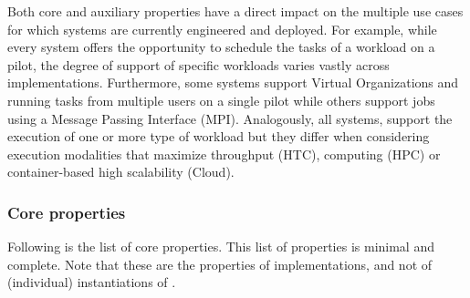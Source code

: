 \documentclass{sig-alternate}
\begin{document}
Both core and auxiliary properties have a direct impact on the multiple use
cases for which \pilot systems are currently engineered and deployed. For
example, while every \pilot system offers the opportunity to schedule the
tasks of a workload on a pilot, the degree of support of specific workloads
varies vastly across implementations. Furthermore, some \pilot systems
support Virtual Organizations and running tasks from multiple users on a single
pilot while others support jobs using a Message Passing Interface (MPI).
Analogously, all \pilot systems, support the execution of one or more type
of workload but they differ when considering execution modalities that maximize
throughput (HTC), computing (HPC) or container-based high scalability (Cloud).

\subsubsection{Core properties}
\label{sec:coreprops}

Following is the list of core properties. This list of properties is minimal
and complete. Note that these are the properties of \pilot implementations, and
not of (individual) instantiations of \pilots.
\end{document}
